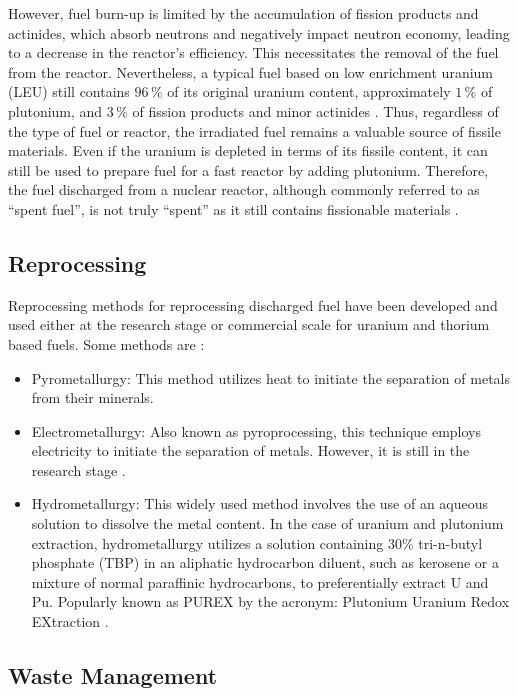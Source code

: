 However, fuel burn-up is limited by the accumulation of fission products and actinides, which absorb neutrons and negatively impact neutron economy, leading to a decrease in the reactor's efficiency. This necessitates the removal of the fuel from the reactor. Nevertheless, a typical fuel based on low enrichment uranium (LEU) still contains \(96 \, \%\) of its original uranium content, approximately \(1 \, \%\) of plutonium, and \(3 \, \%\) of fission products and minor actinides \cite{fuel_cycle_book}. Thus, regardless of the type of fuel or reactor, the irradiated fuel remains a valuable source of fissile materials. Even if the uranium is depleted in terms of its fissile content, it can still be used to prepare fuel for a fast reactor by adding plutonium. Therefore, the fuel discharged from a nuclear reactor, although commonly referred to as ``spent fuel'', is not truly ``spent'' as it still contains fissionable materials \cite{fuel_cycle_book}. 

\subsection{Reprocessing}

Reprocessing methods for reprocessing discharged fuel have been developed and used either at the research stage or commercial scale for uranium and thorium based fuels. Some methods are \cite{Th_cycle_viability}:

\begin{itemize}
    \item Pyrometallurgy: This method utilizes heat to initiate the separation of metals from their minerals. 
    \item Electrometallurgy: Also known as pyroprocessing, this technique employs electricity to initiate the separation of metals. However, it is still in the research stage \cite{Th_cycle_viability}.
    \item Hydrometallurgy: This widely used method involves the use of an aqueous solution to dissolve the metal content. In the case of uranium and plutonium extraction, hydrometallurgy utilizes a solution containing \(30\%\) tri-n-butyl phosphate (TBP) in an aliphatic hydrocarbon diluent, such as kerosene or a mixture of normal paraffinic hydrocarbons, to preferentially extract U and Pu. Popularly known as PUREX by the acronym: Plutonium Uranium Redox EXtraction \cite{fuel_cycle_book}.
\end{itemize}

\subsection{Waste Management}


